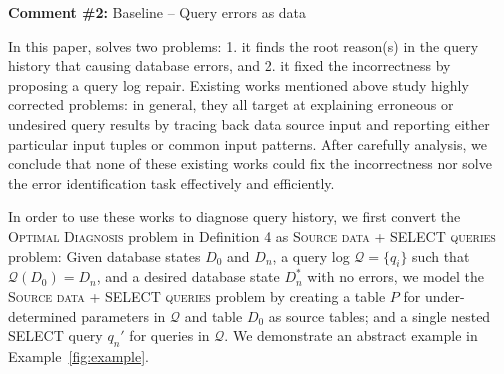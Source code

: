 

\comskip

\noindent
\textbf{Comment \#2:} Baseline -- Query errors as data
\begin{quote}
\end{quote}


In this paper, \sys solves two problems: 1. it finds the root reason(s) in the
query history that causing database errors, and 2. it fixed the incorrectness
by proposing a query log repair. Existing works mentioned above study highly
corrected problems: in general, they all target at explaining erroneous or
undesired query results by tracing back data source input and reporting either
particular input tuples or common input patterns. After carefully analysis, we
conclude that none of these existing works could fix the incorrectness nor
solve the error identification task effectively and efficiently.

In order to use these works to diagnose query history, we first convert the
\textsc{Optimal Diagnosis} problem in Definition 4 as \textsc{Source data +
SELECT queries} problem: Given database states $D_0$ and $D_n$, a query log
$\mathcal{Q} = \{q_i\}$ such that $\mathcal{Q}(D_0) = D_n$, and a desired
database state $D_n^*$ with no errors, we model the \textsc{Source data +
SELECT queries} problem by creating a table $P$ for under-determined
parameters in $\mathcal{Q}$ and table $D_0$ as source tables; and a single
nested SELECT query $q_n'$ for queries in $\mathcal{Q}$. We demonstrate an
abstract example in Example~\ref{fig:example}.

